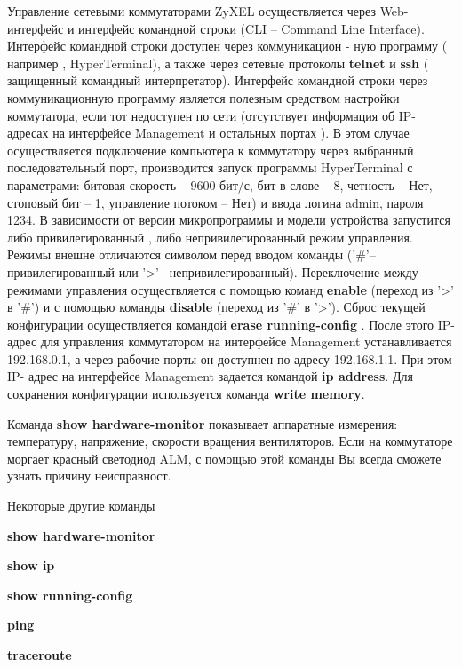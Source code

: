 \documentclass[12pt]{article}
\begin{document}
Управление сетевыми коммутаторами
  ZyXEL  
осуществляется через
Web-
интерфейс  и  интерфейс  командной  строки
  (CLI  –  Command  Line  
Interface).  
Интерфейс командной строки доступен через коммуникацион
-
ную программу
 (
например
, HyperTerminal), 
а также через сетевые протоколы
 \textbf{telnet} 
и
 \textbf{ssh} (
защищенный командный интерпретатор).  
Интерфейс  командной строки  через коммуникационную программу
является полезным средством настройки коммутатора, 
если тот недоступен
по сети
 (отсутствует информация об
 IP-
адресах на интерфейсе
 Management 
и  остальных  портах
).   
В  этом  случае  осуществляется  подключение
компьютера  к  коммутатору  через  выбранный  последовательный  порт,  
производится  запуск  программы
  HyperTerminal  
с  параметрами:  
битовая
скорость
 – 
9600
 бит/с, 
бит в слове
 – 
8, 
четность
 – 
Нет,  
стоповый бит
  –  
1, 
управление потоком
 – 
Нет) 
и ввода логина
admin, 
пароля
1234.  
В  зависимости  от  версии  микропрограммы  и  модели  устройства
запустится либо привилегированный
,  
либо непривилегированный режим управления. 
Режимы внешне отличаются символом перед вводом команды
('\#'–
привилегированный  или
    '>'–
непривилегированный).   
Переключение
между режимами управления осуществляется с помощью команд
\textbf{enable}
(переход из
 '>' 
в
 '\#') 
и с помощью команды
\textbf{disable}
 (переход из
 '\#' 
в
 '>').  
Сброс  текущей  конфигурации  осуществляется  командой
\textbf{erase 
running-config}
.  
После  этого
  IP-
адрес  для  управления  коммутатором  на
интерфейсе
   Management  
устанавливается
192.168.0.1,  
а  через  рабочие
порты  он  доступнен  по  адресу
192.168.1.1.   
При  этом
    IP-
адрес  на
интерфейсе
  Management  
задается  командой
\textbf{ip  address}.  
Для  сохранения
конфигурации используется команда
{\bf write memory}.  

Команда
{\bf show    hardware-monitor}
показывает  аппаратные  измерения:  
температуру,  
напряжение,  
скорости
вращения вентиляторов.  
Если на коммутаторе моргает красный светодиод
ALM,  
с  помощью  этой  команды  Вы  всегда  сможете  узнать  причину
неисправност.

Некоторые другие команды
\begin{list}{-}
\item \textbf{show hardware-monitor}
\item \textbf{show ip}
\item \textbf{show running-config}
\item \textbf{ping}
\item \textbf{traceroute}
\end{list}
\end{document}
